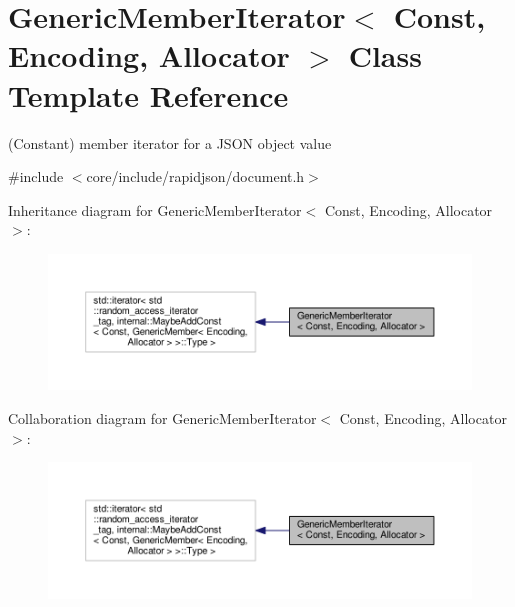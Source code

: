 \hypertarget{classGenericMemberIterator}{}\section{Generic\+Member\+Iterator$<$ Const, Encoding, Allocator $>$ Class Template Reference}
\label{classGenericMemberIterator}


(Constant) member iterator for a J\+S\+ON object value  




{\ttfamily \#include $<$core/include/rapidjson/document.\+h$>$}



Inheritance diagram for Generic\+Member\+Iterator$<$ Const, Encoding, Allocator $>$\+:
\nopagebreak
\begin{figure}[H]
\begin{center}
\leavevmode
\includegraphics[width=350pt]{classGenericMemberIterator__inherit__graph}
\end{center}
\end{figure}


Collaboration diagram for Generic\+Member\+Iterator$<$ Const, Encoding, Allocator $>$\+:
\nopagebreak
\begin{figure}[H]
\begin{center}
\leavevmode
\includegraphics[width=350pt]{classGenericMemberIterator__coll__graph}
\end{center}
\end{figure}
